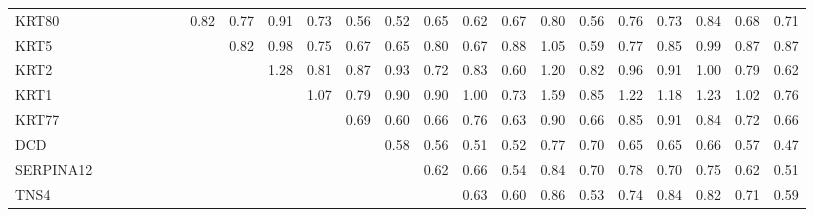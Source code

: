 \begin{longtable}{lrrrrrrrrrrrrrrrrrrrrrr}
KRT80     &            &           &            &            &              &             &       0.82 &       0.77 &       0.91 &        0.73 &      0.56 &            0.52 &       0.65 &        0.62 &        0.67 &        0.80 &       0.56 &         0.76 &         0.73 &       0.84 &          0.68 &         0.71 \\
KRT5      &            &           &            &            &              &             &            &       0.82 &       0.98 &        0.75 &      0.67 &            0.65 &       0.80 &        0.67 &        0.88 &        1.05 &       0.59 &         0.77 &         0.85 &       0.99 &          0.87 &         0.87 \\
KRT2      &            &           &            &            &              &             &            &            &       1.28 &        0.81 &      0.87 &            0.93 &       0.72 &        0.83 &        0.60 &        1.20 &       0.82 &         0.96 &         0.91 &       1.00 &          0.79 &         0.62 \\
KRT1      &            &           &            &            &              &             &            &            &            &        1.07 &      0.79 &            0.90 &       0.90 &        1.00 &        0.73 &        1.59 &       0.85 &         1.22 &         1.18 &       1.23 &          1.02 &         0.76 \\
KRT77     &            &           &            &            &              &             &            &            &            &             &      0.69 &            0.60 &       0.66 &        0.76 &        0.63 &        0.90 &       0.66 &         0.85 &         0.91 &       0.84 &          0.72 &         0.66 \\
DCD       &            &           &            &            &              &             &            &            &            &             &           &            0.58 &       0.56 &        0.51 &        0.52 &        0.77 &       0.70 &         0.65 &         0.65 &       0.66 &          0.57 &         0.47 \\
SERPINA12 &            &           &            &            &              &             &            &            &            &             &           &                 &       0.62 &        0.66 &        0.54 &        0.84 &       0.70 &         0.78 &         0.70 &       0.75 &          0.62 &         0.51 \\
TNS4      &            &           &            &            &              &             &            &            &            &             &           &                 &            &        0.63 &        0.60 &        0.86 &       0.53 &         0.74 &         0.84 &       0.82 &          0.71 &         0.59 \\

\end{longtable}
